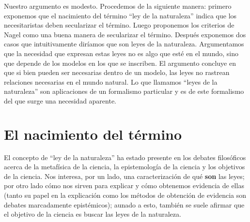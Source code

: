 Nuestro argumento es modesto. Procedemos de la siguiente manera: primero exponemos que el nacimiento del término ``ley de la naturaleza'' indica que los necesitaristas deben secularizar el término. Luego proponemos los criterios de Nagel como una buena manera de secularizar el término. Después exponemos dos casos que intuitivamente diríamos que son leyes de la naturaleza. Argumentamos que la necesidad que expresan estas leyes no es algo que esté en el mundo, sino que depende de los modelos en los que se inscriben. El argumento concluye en que si bien pueden ser necesarias dentro de un modelo, las leyes no rastrean relaciones necesarias en el mundo natural. Lo que llamamos ``leyes de la naturaleza'' son aplicaciones de un formalismo particular y es de este formalismo del que surge una necesidad aparente.

\section{El nacimiento del término}

\noindent El concepto de ``ley de la naturaleza'' ha estado presente en los debates filosóficos acerca de la metafísica de la ciencia, la epistemología de la ciencia y los objetivos de la ciencia. Nos interesa, por un lado, una caracterización de qué \textbf{son} las leyes; por otro lado cómo nos sirven para explicar y cómo obtenemos evidencia de ellas (tanto su papel en la explicación como los métodos de obtención de evidencia son debates marcadamente epistémicos); aunado a esto, también se suele afirmar que el objetivo de la ciencia es buscar las leyes de la naturaleza.


